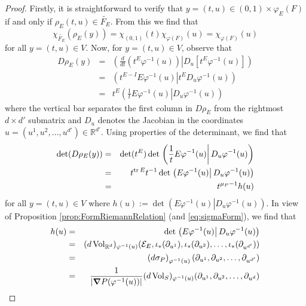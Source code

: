 \documentclass[11pt]{article}
\renewcommand\det{\operatorname{det}}
\newcommand{\Vol}{\operatorname{Vol}}
\begin{document}
\begin{proof}
Firstly, it is straightforward to verify that $y=(t,u)\in (0,1)\times \varphi_E(F)$ if and only if $\rho_E(t,u)\in\widetilde{F_E}$. From this we find that
\begin{equation}\label{eq:RiemannLebesgue2}
    \chi_{\widetilde{F_E}}(\rho_E(y))=\chi_{(0,1)}(t)\chi_{\varphi(F)}(u)=\chi_{\varphi(F)}(u)
\end{equation}
for all $y=(t,u)\in V$. Now, for $y=(t,u)\in V$, observe that
\begin{eqnarray*}
D\rho_E(y)&=&\left.\left(\frac{d}{dt}(t^E\varphi^{-1}(u)) \right\vert D_u\left[t^E\varphi^{-1}(u)\right]\right)\\
&=&\left.\left(t^{E-I}E\varphi^{-1}(u)\right\vert t^E D_u\varphi^{-1}(u)\right)\\
&=&t^E\left.\left(\frac{1}{t}E\varphi^{-1}(u)\right\vert D_u\varphi^{-1}(u)\right)
\end{eqnarray*}
where the vertical bar separates the first column in $D\rho_E$ from the rightmost $d\times d'$ submatrix and $D_u$ denotes the Jacobian in the coordinates $u=(u^1,u^2,\dots,u^{d'})\in\mathbb{R}^{d'}$. Using properties of the determinant, we find that
\begin{eqnarray}\label{eq:RiemannLebesgue3}\nonumber
    \det(D\rho_E(y))&=&\det(t^E)\det\left.\left(\frac{1}{t}E\varphi^{-1}(u)\right\vert D_u\varphi^{-1}(u)\right)\\\nonumber
    &=&t^{\tr E}t^{-1}\det\left.\left(E\varphi^{-1}(u)\right\vert D_u\varphi^{-1}(u)\right)\\
    &=&t^{\mu_P-1}h(u)
\end{eqnarray}
for all $y=(t,u)\in V$ where $h(u):=\det\left.\left(E\varphi^{-1}(u)\right\vert D_u\varphi^{-1}(u)\right)$. In view of Proposition \ref{prop:FormRiemannRelation} (and \eqref{eq:sigmaForm}), we find that
\begin{eqnarray}\label{eq:RiemannLebesgue4}\nonumber
    h(u)&=&
    \det\left.\left(E\varphi^{-1}(u)\right\vert D_u\varphi^{-1}(u)\right)\\ \nonumber
    &=&
    (d\Vol_{\mathbb{R}^d})_{\varphi^{-1}(u)}(\mathcal{E}_E,\iota_*(\partial_{u^1}),\iota_*(\partial_{u^2}),\dots,\iota_*(\partial_{u^{d'}}))\\ \nonumber
    &=&\left(d\sigma_P\right)_{\varphi^{-1}(u)}(\partial_{u^1},\partial_{u^2},\dots,\partial_{u^{d'}})\\
    &=&\frac{1}{|\grad P(\varphi^{-1}(u))|} (d\Vol_S)_{\varphi^{-1}(u)} (\partial_{u^1}, \partial_{u^2},\dots,\partial_{u^d})
\end{eqnarray}

\end{proof}
\end{document}
